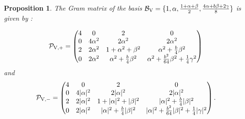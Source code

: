 \documentclass[table]{amsart}
\newtheorem{proposition}[theorem]{Proposition}
\numberwithin{equation}{section}
\begin{document}
\begin{proposition}\label{28 propn}
The Gram matrix of the basis $\mathcal{B}_{\rm{V}} = \{1,\alpha,\frac{1 + \alpha + \beta}{2},\frac{4\alpha + b \beta + 2 \gamma}{8}\}$ is given by :

$$
\mathcal{P}_{\rm{V}, +}=  
\begin{pmatrix} 
4 & 0 & 2 & 0 \\
0 & 4\alpha^2 & 2\alpha^2 & 2\alpha^2 \\ 
2 & 2\alpha^2 & 1 + \alpha^2 + \beta^2 & \alpha^2 + \frac{b}{4}\beta^2 \\
0 & 2\alpha^2 & \alpha^2 + \frac{b}{4}\beta^2 & \alpha^2 + \frac{b^2}{64}\beta^2 + \frac{1}{4}\gamma^2 
\end{pmatrix}
$$
and
$$
\mathcal{P}_{\rm{V}, -}=  
\begin{pmatrix} 
4 & 0 & 2 & 0 \\
0 & 4|\alpha|^2 & 2|\alpha|^2 & 2|\alpha|^2 \\ 
2 & 2|\alpha|^2 & 1 + |\alpha|^2 + |\beta|^2 & |\alpha|^2 + \frac{b}{4}|\beta|^2 \\
0 & 2|\alpha|^2 & |\alpha|^2 + \frac{b}{4}|\beta|^2 & |\alpha|^2 + \frac{b^2}{64}|\beta|^2 + \frac{1}{4}|\gamma|^2 
\end{pmatrix}.
$$
\end{proposition}
\end{document}
